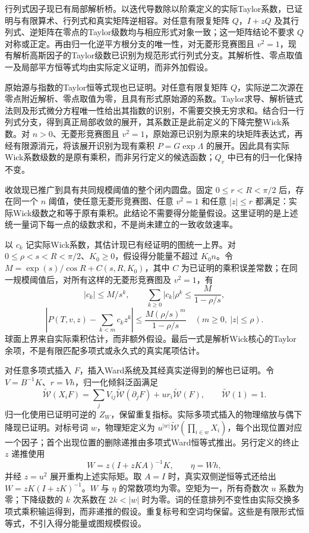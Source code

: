 \documentclass[UTF8,11pt,fontset=fandol]{ctexart}
\begin{document}
行列式因子现已有局部解析桥。以迭代导数除以阶乘定义的实际Taylor系数，已证明与有限算术、行列式和真实矩阵逆相容。对任意有限复矩阵 $Q$，$I+zQ$ 及其行列式、逆矩阵在零点的Taylor级数均与相应形式对象一致；这一矩阵结论不要求 $Q$ 对称或正定。再由归一化逆平方根分支的唯一性，对无菱形竞赛图且 $v^2=1$，现有解析高斯因子的Taylor级数已识别为规范形式行列式分支。其解析性、零点取值一及局部平方恒等式均由实际定义证明，而非外加假设。

原始源与指数的Taylor恒等式现也已证明。对任意有限复矩阵 $Q$，实际逆二次源在零点附近解析、零点取值为零，且具有形式原始源的系数。Taylor求导、解析链式法则及形式微分方程唯一性给出其指数的识别，不需要交换无穷求和。结合归一行列式分支，得到真正局部收敛的展开，其系数正是此前定义的下降完整Wick系数。对 $n>0$、无菱形竞赛图且 $v^2=1$，原始源已识别为原来的块矩阵表达式，再经有限源消元，将该展开识别为现有乘积 $P=G\exp\Lambda$ 的展开。因此具有实际Wick系数级数的是原有乘积，而非另行定义的候选函数；$Q_v$ 中已有的归一化保持不变。

收敛现已推广到具有共同规模阈值的整个闭内圆盘。固定 $0\le r<R<\pi/2$ 后，存在同一个 $n$ 阈值，使任意无菱形竞赛图、任意 $v^2=1$ 和任意 $|z|\le r$ 都满足：实际Wick级数之和等于原有乘积。此结论不需要得分能量假设。这里证明的是上述统一量词下每一点的级数求和，不是尚未建立的一致收敛速率。

以 $c_k$ 记实际Wick系数，其估计现已有经证明的图统一上界。对 $0\le\rho<s<R<\pi/2$、$K_0\ge0$，假设得分能量不超过 $K_0n$。令 $M=\exp(s)/\cos R+C(s,R,K_0)$，其中 $C$ 为已证明的乘积误差常数；在同一规模阈值后，对所有这样的无菱形竞赛图及 $v^2=1$，有
\[
 |c_k|\le M/s^k,\qquad \sum_{k\ge0}|c_k|\rho^k\le\frac{M}{1-\rho/s},
\]
\[
 \left|P(T,v,z)-\sum_{k<m}c_kz^k\right|
 \le\frac{M(\rho/s)^m}{1-\rho/s}\quad(m\ge0,\ |z|\le\rho).
\]
球面上界来自实际乘积估计，而非额外假设。最后一式是解析Wick核心的Taylor余项，不是有限匹配多项式或永久式的真实尾项估计。

对任意多项式插入 $F$，插入Ward系统及其经真实逆得到的解也已证明。令 $V=B^{-1}K$、$r=Vh$，归一化倾斜泛函满足
\[
 \widetilde{\mathcal W}(X_iF)
 =\sum_jV_{ij}\widetilde{\mathcal W}(\partial_jF)
   +u r_i\widetilde{\mathcal W}(F),\qquad
 \widetilde{\mathcal W}(1)=1.
\]
归一化使用已证明可逆的 $Z_W$，保留重复指标。实际多项式插入的物理缩放与偶下降现已证明。对标号词 $w$，物理矩定义为 $u^{|w|}\widetilde{\mathcal W}(\prod_{i\in w}X_i)$，每个出现位置对应一个因子；首个出现位置的删除递推由多项式Ward恒等式推出。另行定义的终止 $z$ 递推使用
\[
 W=z(I+zKA)^{-1}K,\qquad \eta=Wh,
\]
并经 $z=u^2$ 展开重构上述实际矩。取 $A=I$ 时，真实双侧逆恒等式还给出 $W=zK(I+zK)^{-1}$。$W$ 与 $\eta$ 的常数项均为零。空矩为一，所有奇数次 $u$ 系数为零；下降级数的 $k$ 次系数在 $2k<|w|$ 时为零。词的任意排列不变性由实际交换多项式乘积输运得到，而非递推的假设。重复标号和空词均保留。这些是有限形式恒等式，不引入得分能量或图规模假设。
\end{document}
